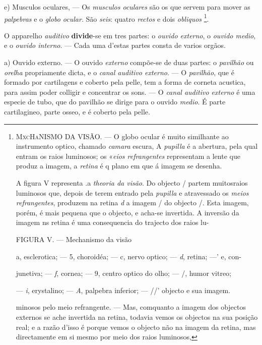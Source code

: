 e) Musculos oculares, --- Os \emph{musculos oculares} são os que servem para mover as \emph{palpebras} e o \emph{globo ocular}. São \emph{seis}: quatro \emph{rectos} e dois \emph{obliquos} \footnote{\textsc{MxcHaNISMO} DA VISÃO. --- O globo ocular é muito similhante ao instrumento optico, chamado \emph{camara} escura, A \emph{pupilla} é a abertura, pela qual entram os raios luminosos; os «\emph{eios refrangentes} representam a lente que produz a imagem, a \emph{retina} é q plano em que á imagem se desenha.\par A figura V representa .a \emph{theoria da visão}. Do objecto / partem muitosraios luminosos que, depois de terem entrado pela \emph{pupilla} e atravessado os \emph{meios refrangentes}, produzem na retina \emph{d} a imagem / do objecto /. Esta imagem, porém, é mais pequena que o objecto, e acha-se invertida. A inversão da imagem ns retina é uma consequencia do trajecto dos raios lu-\par FIGURA V. --- Mechanismo da visão\par a, esclerotica; --- 5, choroidéa; --- c, nervo optico; --- \emph{d}, retina; ---' e, con-\par junetiva; --- \emph{f}, cornea; --- 9, centro optico do olho; --- /, humor vitreo;\par --- \emph{i}, erystalino; --- \emph{A}, palpebra inferior; --- //' objecto e sua imagem.\par minosos pelo meio refrangente. --- Mas, comquanto a imagem dos objectos externos se ache invertida na retina, todavia vemos os objectos na sua posição real; e a razão d'isso é porque vemos o objecto não na imagem da retina, mas directamente em si mesmo por meio dos raios luminosos,}.


 
O apparelho \emph{auditivo} \textbf{divide}-se em tres partes: o \emph{ouvido externo}, o \emph{ouvido medio}, e o \emph{ouvido interno}. --- Cada uma d'estas partes consta de varios orgãos.

a) Ouvido externo. --- O ouvido \emph{externo} compõe-se de duas partes: o \emph{pavilhão} ou \emph{orelha} propriamente dicta, e o \emph{canal auditivo externo}. --- O \emph{pavilhão}, que é formado por cartilagens e coberto pela pelle, tem a forma de corneta acustica, para assim poder colligir e concentrar os sons. --- O \emph{canal auditivo externo} é uma especie de tubo, que do pavilhão se dirige para o ouvido \emph{medio}. É parte cartilagineo, parte osseo, e é coberto pela pelle.

